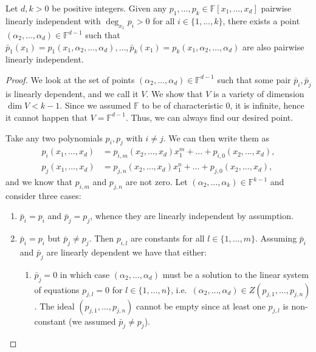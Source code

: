 \documentclass[10pt,a4paper]{amsart}
\newcommand{\F}{\mathbb{F}}
\begin{document}
\begin{lemma}
	\label{lem:projection}
	Let $ d,k>0 $ be positive integers. Given any $ p_1, \ldots, p_k
	\in \F[x_1, \ldots, x_d]$ pairwise linearly independent with $ \deg_{x_1}
	p_i > 0 $ for all $ i \in \{1, \ldots, k\} $,
	there exists a point $ (\alpha_2, \ldots, \alpha_d) \in \F^{d-1} $ such that
	$ \bar{p}_1(x_1) = p_1(x_1, \alpha_2, \ldots, \alpha_d), \ldots,
	\bar{p}_k(x_1) = p_k(x_1, \alpha_2, \ldots, \alpha_d) $ are also pairwise linearly independent.
\end{lemma}

\begin{proof}
	We look at the set of points $ (\alpha_2, \ldots, \alpha_d) \in \F^{d-1} $ such
	that some pair $ \bar{p}_i, \bar{p}_j $ is linearly dependent, and we call it $ V
	$. We show that $ V $ is a variety of dimension $ \dim V < k-1 $. Since we
	assumed $ \F $ to be of characteristic $ 0 $, it is infinite, hence
	it cannot happen that $ V = \F^{d-1} $. Thus, we can always find our desired
	point.

	Take any two polynomials $ p_i, p_j $ with $ i\neq j $. We can then write them as
	\begin{align*}
		p_i(x_1, \ldots, x_d) &= p_{i,m}(x_2, \ldots, x_d)x_1^m + \ldots +
		p_{i,0}(x_2, \ldots, x_d),\\
		p_j(x_1, \ldots, x_d) &= p_{j,n}(x_2, \ldots, x_d)x_1^n + \ldots +
		p_{j,0}(x_2, \ldots, x_d),
	\end{align*}
	and we know that $ p_{i,m} $ and $ p_{j,n} $ are not zero. Let $ (\alpha_2,
	\ldots, \alpha_k) \in \F^{k-1}$ and consider three cases:	
	\begin{enumerate}
		\item
			$ \bar{p}_i = p_i $ and $ \bar{p}_j = p_j $, whence they are linearly
		independent by assumption.
		 \item
			 $ \bar{p}_i = p_i $ but $ \bar{p}_j \neq p_j $. Then $ p_{i,l} $ are
			 constants for all $ l \in \{1, \ldots, m\} $. Assuming $ \bar{p}_i
			 $ and $ \bar{p}_j $ are linearly dependent we have that either:
			 \begin{enumerate}
			 	\item
					 $ \bar{p}_j = 0 $ in which case $ (\alpha_2, \ldots, \alpha_d) $ must
					 be a solution to the linear system of equations $ p_{j, l} = 0 $ for $ l
					 \in \{1, \ldots, n\} $, i.e.\ $ (\alpha_2, \ldots, \alpha_d) \in
					 Z(p_{j,1}, \ldots, p_{j, n}) $. The ideal $ (p_{j,1}, \ldots, p_{j,
					 n}) $ cannot be empty since at least one $ p_{j,l} $ is
					 non-constant (we assumed $ \bar{p}_j \neq p_j $).


\end{enumerate}
\end{enumerate}
\end{proof}
\end{document}
